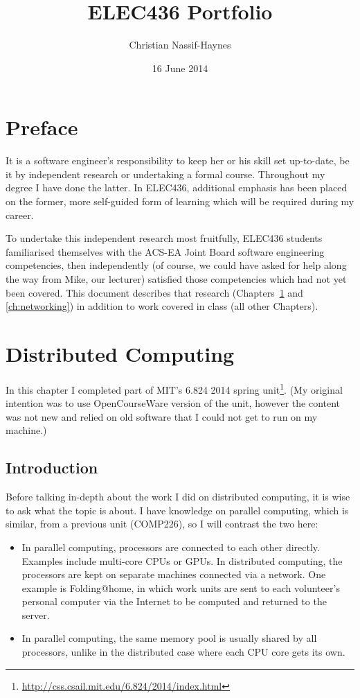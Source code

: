 \documentclass[11pt,a4paper]{report}
\title{ELEC436 Portfolio}
\author{Christian Nassif-Haynes}
\date{16 June 2014}
\makeatletter
\newcommand{\at}{\makeatletter @\makeatother}
\makeatother
\begin{document}
	\maketitle
	
	\chapter*{Preface}
	It is a software engineer's responsibility to keep her or his skill set up-to-date, be it by independent research or undertaking a formal course. Throughout my degree I have done the latter. In ELEC436, additional emphasis has been placed on the former, more self-guided form of learning which will be required during my career.
	
	To undertake this independent research most fruitfully, ELEC436 students familiarised themselves with the ACS-EA Joint Board software engineering competencies, then independently (of course, we could have asked for help along the way from Mike, our lecturer) satisfied those competencies which had not yet been covered. This document describes that research (Chapters~\ref{ch:distributed} and \ref{ch:networking}) in addition to work covered in class (all other Chapters).
	
	\tableofcontents
	
	\chapter{Distributed Computing} \label{ch:distributed}
	In this chapter I completed part of MIT's 6.824 2014 spring unit\footnote{\url{http://css.csail.mit.edu/6.824/2014/index.html}}. (My original intention was to use OpenCourseWare version of the unit, however the content was not new and relied on old software that I could not get to run on my machine.)
	
	
	\section{Introduction}
	Before talking in-depth about the work I did on distributed computing, it is wise to ask what the topic is about. I have knowledge on parallel computing, which is similar, from a previous unit (COMP226), so I will contrast the two here:
	\begin{itemize}
		\item In parallel computing, processors are connected to each other directly. Examples include multi-core CPUs or GPUs. In distributed computing, the processors are kept on separate machines connected via a network. One example is Folding\at home, in which work units are sent to each volunteer's personal computer via the Internet to be computed and returned to the server.
		\item In parallel computing, the same memory pool is usually shared by all processors, unlike in the distributed case where each CPU core gets its own.
	\end{itemize}
	
\end{document}
